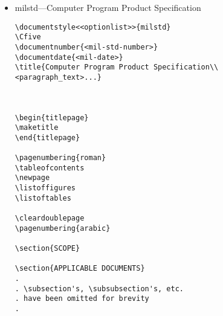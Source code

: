 \begin{itemize}
\begin{small}
\begin{verbatim}
\section{NOTES}

\appendix
%
% \section will now generate appendices starting with section 10, 20, etc.
%
\section{<text>} % Section 10, Appendix I

\section{<text>} % Section 20, Appendix II


\end{verbatim}
\end{small}

\item milstd---Computer Program Product Specification

\begin{small}
\begin{verbatim}
\documentstyle<<optionlist>>{milstd}
\Cfive
\documentnumber{<mil-std-number>}
\documentdate{<mil-date>}
\title{Computer Program Product Specification\\
<paragraph_text>...}



\begin{titlepage}
\maketitle
\end{titlepage}

\pagenumbering{roman}
\tableofcontents
\newpage
\listoffigures
\listoftables

\cleardoublepage
\pagenumbering{arabic}

\section{SCOPE}

\section{APPLICABLE DOCUMENTS}
.
. \subsection's, \subsubsection's, etc.
. have been omitted for brevity
.


\end{verbatim}
\end{small}
\end{itemize}
